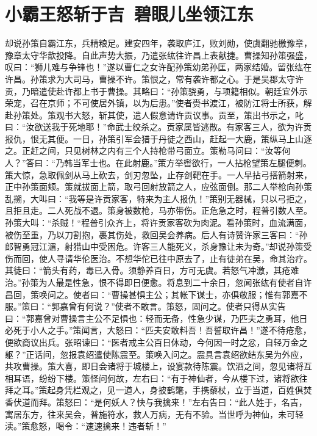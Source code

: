 \chapter{小霸王怒斩于吉~碧眼儿坐领江东}

却说孙策自霸江东，兵精粮足。建安四年，袭取庐江，败刘勋，使虞翻驰檄豫章，豫章太守华歆投降。自此声势大振，乃遣张纮往许昌上表献捷。曹操知孙策强盛，叹曰：“狮儿难与争锋也！”遂以曹仁之女许配孙策幼弟孙匡，两家结婚。留张纮在许昌。孙策求为大司马，曹操不许。策恨之，常有袭许都之心。于是吴郡太守许贡，乃暗遣使赴许都上书于曹操。其略曰：“孙策骁勇，与项籍相似。朝廷宜外示荣宠，召在京师；不可使居外镇，以为后患。”使者赍书渡江，被防江将士所获，解赴孙策处。策观书大怒，斩其使，遣人假意请许贡议事。贡至，策出书示之，叱曰：“汝欲送我于死地耶！”命武士绞杀之。贡家属皆逃散。有家客三人，欲为许贡报仇，恨无其便。一日，孙策引军会猎于丹徒之西山，赶起一大鹿，策纵马上山逐之。正赶之间，只见树林之内有三个人持枪带弓面立。策勒马问曰：“汝等何人？”答曰：“乃韩当军士也。在此射鹿。”策方举辔欲行，一人拈枪望策左腿便刺。策大惊，急取佩剑从马上砍去，剑刃忽坠，止存剑靶在手。一人早拈弓搭箭射来，正中孙策面颊。策就拔面上箭，取弓回射放箭之人，应弦面倒。那二人举枪向孙策乱搠，大叫曰：“我等是许贡家客，特来为主人报仇！”策别无器械，只以弓拒之，且拒且走。二人死战不退。策身被数枪，马亦带伤。正危急之时，程普引数人至。孙策大叫：“杀贼！“程普引众齐上，将许贡家客砍为肉泥。看孙策时，血流满面，被伤至重，乃以刀割抱，裹其伤处，救回吴会养病。后人有诗赞许家三客曰：“孙郎智勇冠江湄，射猎山中受困危。许客三人能死义，杀身豫让未为奇。”却说孙策受伤而回，使人寻请华伦医治。不想华佗已往中原去了，止有徒弟在吴，命其治疗。其徒曰：“箭头有药，毒已入骨。须静养百日，方可无虞。若怒气冲激，其疮难治。”孙策为人最是性急，恨不得即日便愈。将息到二十余日，忽闻张纮有使者自许昌回，策唤问之。使者曰：“曹操甚惧主公；其帐下谋士，亦俱敬服；惟有郭嘉不服。”策曰：“郭嘉曾有何说？”使者不敢言。策怒，固问之。使者只得从实告曰：“郭嘉曾对曹操言主公不足惧也：轻而无备，性急少谋，乃匹夫之勇耳，他日必死于小人之手。”策闻言，大怒曰：“匹夫安敢料吾！吾誓取许昌！”遂不待疮愈，便欲商议出兵。张昭谏曰：“医者戒主公百日休动，今何因一时之忿，自轻万金之躯？”正话间，忽报袁绍遣使陈震至。策唤入问之。震具言袁绍欲结东吴为外应，共攻曹操。策大喜，即日会诸将于城楼上，设宴款待陈震。饮酒之间，忽见诸将互相耳语，纷纷下楼。策怪问何故，左右曰：“有于神仙者，今从楼下过，诸将欲往拜之耳。”策起身凭栏观之，见一道人，身披鹤氅，手携藜杖，立于当道，百姓俱焚香伏道而拜。策怒曰：“是何妖人？快与我擒来！”左右告曰：“此人姓于，名吉，寓居东方，往来吴会，普施符水，救人万病，无有不验。当世呼为神仙，未可轻渎。”策愈怒，喝令：“速速擒来！违者斩！”

